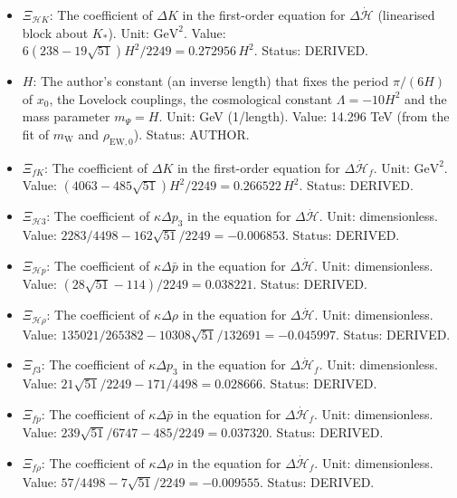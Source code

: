\documentclass[
  10pt,
]{article}
\providecommand{\tightlist}{%
  \setlength{\itemsep}{0pt}\setlength{\parskip}{0pt}}
\begin{document}
\begin{itemize}
\tightlist
\item
  \(\Xi_{\mathcal{H}K}\): The coefficient of \(\Delta K\) in the
  first-order equation for \(\Delta\dot{\mathcal{H}}\) (linearised block
  about \(K_*\)). Unit: \(\mathrm{GeV}^{2}\). Value:
  \(6(238 - 19\sqrt{51})H^2/2249 = 0.272956\,H^2\). Status: DERIVED.
\item
  \(H\): The author's constant (an inverse length) that fixes the period
  \(\pi/(6H)\) of \(x_0\), the Lovelock couplings, the cosmological
  constant \(\Lambda = -10H^2\) and the mass parameter \(m_\Psi = H\).
  Unit: GeV (1/length). Value: 14.296 TeV (from the fit of
  \(m_{\mathrm{W}}\) and \(\rho_{\mathrm{EW},0}\)). Status: AUTHOR.
\item
  \(\Xi_{fK}\): The coefficient of \(\Delta K\) in the first-order
  equation for \(\Delta\dot{\mathcal{H}}_f\). Unit:
  \(\mathrm{GeV}^{2}\). Value:
  \((4063 - 485\sqrt{51})H^2/2249 = 0.266522\,H^2\). Status: DERIVED.
\item
  \(\Xi_{\mathcal{H}3}\): The coefficient of \(\kappa\Delta p_3\) in the
  equation for \(\Delta\dot{\mathcal{H}}\). Unit: dimensionless. Value:
  \(2283/4498 - 162\sqrt{51}/2249 = -0.006853\). Status: DERIVED.
\item
  \(\Xi_{\mathcal{H}p}\): The coefficient of \(\kappa\Delta\bar p\) in
  the equation for \(\Delta\dot{\mathcal{H}}\). Unit: dimensionless.
  Value: \((28\sqrt{51} - 114)/2249 = 0.038221\). Status: DERIVED.
\item
  \(\Xi_{\mathcal{H}\rho}\): The coefficient of \(\kappa\Delta\rho\) in
  the equation for \(\Delta\dot{\mathcal{H}}\). Unit: dimensionless.
  Value: \(135021/265382 - 10308\sqrt{51}/132691 = -0.045997\). Status:
  DERIVED.
\item
  \(\Xi_{f3}\): The coefficient of \(\kappa\Delta p_3\) in the equation
  for \(\Delta\dot{\mathcal{H}}_f\). Unit: dimensionless. Value:
  \(21\sqrt{51}/2249 - 171/4498 = 0.028666\). Status: DERIVED.
\item
  \(\Xi_{fp}\): The coefficient of \(\kappa\Delta\bar p\) in the
  equation for \(\Delta\dot{\mathcal{H}}_f\). Unit: dimensionless.
  Value: \(239\sqrt{51}/6747 - 485/2249 = 0.037320\). Status: DERIVED.
\item
  \(\Xi_{f\rho}\): The coefficient of \(\kappa\Delta\rho\) in the
  equation for \(\Delta\dot{\mathcal{H}}_f\). Unit: dimensionless.
  Value: \(57/4498 - 7\sqrt{51}/2249 = -0.009555\). Status: DERIVED.
\end{itemize}
\end{document}
